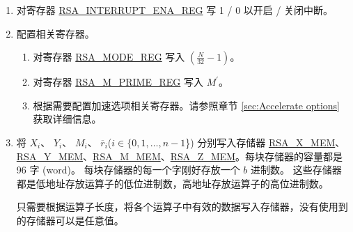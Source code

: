 \documentclass[main\_\_CN.tex]{subfiles}
\begin{document}
\begin{enumerate}

    \item 对寄存器 \hyperref[regdesc:RSAINTERRUPTENAREG]{RSA\_INTERRUPT\_ENA\_REG} 写 1 / 0 以开启 / 关闭中断。
    
    \item 配置相关寄存器。    
    
    \begin{enumerate}
        \item 对寄存器 \hyperref[regdesc:RSAMODEXPMODEREG]{RSA\_MODE\_REG} 写入 \begin{math}( \frac{N}{32} - 1 )\end{math}。
        
        \item 对寄存器 \hyperref[regdesc:RSAMPRIMEREG]{RSA\_M\_PRIME\_REG} 写入 \begin{math}M^{\prime}\end{math}。
      
        \item 根据需要配置加速选项相关寄存器。请参照章节 \ref{sec:Accelerate options} 获取详细信息。   
    \end{enumerate}

    \item 将
        \begin{math}X_{i}\end{math}、
        \begin{math}Y_{i}\end{math}、
        \begin{math}M_{i}\end{math}、
        \begin{math}\overline{r}_{i}\end{math}(\begin{math}i \in \{ 0, 1, \dots, n-1 \end{math}\})
        分别写入存储器 \hyperref[regdesc:RSAmemory]{RSA\_X\_MEM}、\hyperref[regdesc:RSAmemory]{\hyperref[regdesc:RSAmemory]{RSA\_Y\_MEM}}、\hyperref[regdesc:RSAmemory]{RSA\_M\_MEM}、\hyperref[regdesc:RSAmemory]{RSA\_Z\_MEM}。每块存储器的容量都是 96 字 (word)。
        每块存储器的每一个字刚好存放一个 \begin{math}b\end{math} 进制数。
        这些存储器都是低地址存放运算子的低位进制数，高地址存放运算子的高位进制数。
        
        只需要根据运算子长度，将各个运算子中有效的数据写入存储器，没有使用到的存储器可以是任意值。


\end{enumerate}
\end{document}
